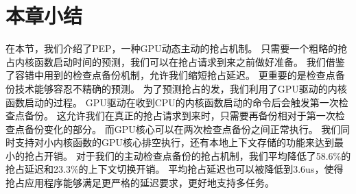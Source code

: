 \section{本章小结}

在本节，我们介绍了PEP，一种GPU动态主动的抢占机制。
只需要一个粗略的抢占内核函数启动时间的预测，我们可以在抢占请求到来之前做好准备。
我们借鉴了容错中用到的检查点备份机制，允许我们缩短抢占延迟。
更重要的是检查点备份技术能够容忍不精确的预测。
为了预测抢占的发，我们利用了GPU驱动的内核函数启动的过程。
GPU驱动在收到CPU的内核函数启动的命令后会触发第一次检查点备份。
这允许我们在真正的抢占请求到来时，只需要再备份相对于第一次检查点备份变化的部分。
而GPU核心可以在两次检查点备份之间正常执行。
我们同时支持对小内核函数的GPU核心排空执行，还有本地上下文存储的功能来达到最小的抢占开销。
对于我们的主动检查点备份的抢占机制，我们平均降低了58.6\%的抢占延迟和23.3\%的上下文切换开销。
平均抢占延迟也可以被降低到3.6us，使得抢占应用程序能够满足更严格的延迟要求，更好地支持多任务。